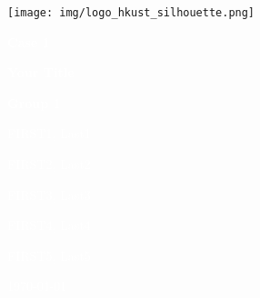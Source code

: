 \pagecolor{RDarkBlue}\afterpage{\nopagecolor}


\texttt{[image: img/logo\_hkust\_silhouette.png]}
\vspace*{3cm}

{\sffamily
\fontsize{70}{75}\selectfont \textcolor{white}{\textbf{Case 1}}

\vspace{5mm}
\Huge\textcolor{white}{\textbf{Your Title}}

\vspace{80mm}

\LARGE\textcolor{white}{\textbf{Group 1}}

\vspace*{1ex}
{\Large
\textcolor{white}{FIRST1, Last1}

\textcolor{white}{FIRST2, Last2}

\textcolor{white}{FIRST3, Last3}

\textcolor{white}{FIRST4, Last4}

\textcolor{white}{FIRST5, Last5}

\vspace{3cm}
}

\normalsize
\textcolor{white}\today
}

\thispagestyle{empty}

\restoregeometry
\newpage